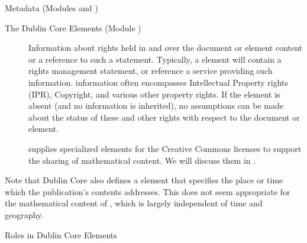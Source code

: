 \begin{tchapter}[id=metadata,short=Metadata]{Metadata (Modules {} and  {})}
\begin{tsection}[id=dc-elements]{The Dublin Core Elements (Module {})}
\begin{description}
\item[{}] Information about rights held in and over the
  document or element content or a reference to such a statement. Typically, a
  {} element will contain a rights management statement, or
  reference a service providing such information. {}
  information often encompasses Intellectual Property rights (IPR), Copyright, and various
  other property rights. If the {} element is absent (and no
  {} information is inherited), no assumptions can be made
  about the status of these and other rights with respect to the document or element.
  
  {\omdoc} supplies specialized elements for the Creative Commons licenses to support the
  sharing of mathematical content. We will discuss them in {}.
\end{description}
Note that Dublin Core also defines a {} element that
specifies the place or time which the publication's contents addresses. This does
not seem appropriate for the mathematical content of {\omdoc}, which is largely
independent of time and geography.
\end{tsection}

\begin{tsection}[id=dc-roles]{Roles in Dublin Core Elements}


\end{tsection}
\end{tchapter}
